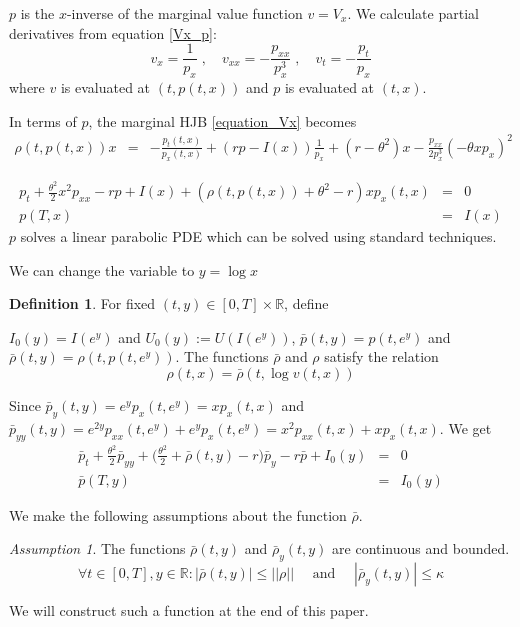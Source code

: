 \documentclass[11pt, psfig]{article}
\theoremstyle{definition}
\newtheorem{definition}[theorem]{Definition}
\theoremstyle{remark}
\newtheorem{assumption}[theorem]{Assumption}
\numberwithin{equation}{section}
\def\sR{\mathbb{R}}
\def\sR{\mathbb{R}}
\newcommand{\be}{\begin{equation}}
\newcommand{\ee}{\end{equation}}
\begin{document}
$p$ is the $x$-inverse of the marginal value function $v=V_x$.
We calculate partial derivatives from equation \eqref{Vx_p}: 
 \begin{equation}\label{relations_vp}
v_{x}=\frac{1}{p_x} \; , \quad v_{xx}=-\frac{p_{xx}}{p_x^3} \; , \quad v_{t}=-\frac{p_t}{p_x}
\end{equation}
where $v$ is evaluated at $(t, p(t,x))$ and $p$ is evaluated at $(t, x)$.

In terms of $p$, the marginal HJB \eqref{equation_Vx} becomes
\begin{eqnarray*}
\rho(t,p(t,x)) x&=&-\frac{p_t(t,x)}{p_x(t,x)}+(rp-I(x))\frac{1}{p_x}+(r-\theta^2)x-\frac{p_{xx}}{2p_x^3}(-\theta xp_x)^2
\end{eqnarray*}

\begin{eqnarray}\label{PDE_p}
p_t+\frac{\theta^2}{2}x^2p_{xx}
-rp+I(x)+(\rho(t,p(t,x))+\theta^2-r)xp_x (t,x)&=&0 \\
p(T,x) &=& I(x)
\end{eqnarray}
$p$ solves a linear parabolic PDE which can be solved using standard techniques.

We can change the variable to $ y=\log x$  
\begin{definition}
For fixed $(t,y)\in [0,T]\times \sR$, define

 $I_0(y)=I(e^y)$ and $U_0(y):=U(I(e^y))$,  
  $\bar{p}(t,y)=p(t,e^y)$ and $\bar{\rho}(t, y)=\rho(t,p(t,e^y))$.
  The functions 
$\bar{\rho}$ and $\rho$ satisfy the relation
\be
\rho(t,x) = \bar{\rho}(t, \log v(t,x)) 
\ee
 \end{definition}
 Since $\bar{p}_{y}(t,y)=e^y p_x(t,e^y) =xp_x(t,x)$ and $\bar{p}_{yy}(t,y)=e^{2y} p_{xx}(t,e^y)+e^yp_x(t,e^y) =x^2p_{xx}(t,x)+xp_x(t,x)$. 
  We get
\begin{eqnarray}
\bar{p}_{t}+\frac{\theta^2}{2}\bar{p}_{yy}+\big(\frac{\theta^2}{2}+\bar{\rho}(t,y)-r\big)\bar{p}_y -r\bar{p} +I_0(y)&=&0 \label{PDE_barp}\\
\bar{p}(T,y)&=&I_0(y)
\end{eqnarray}

We make the following assumptions about the function $\bar{\rho}$.

\begin{assumption}
The functions $\bar{\rho}(t,y)$ and $\bar{\rho}_y(t,y)$ are continuous and bounded.
\be
\forall t\in[0,T], y\in \sR: |\bar{\rho}(t,y)|\leq ||\rho|| \quad \textrm{ and } \quad |\bar{\rho}_{y}(t,y)| \leq  \kappa
\ee
\end{assumption}
We will construct such a function at the end of this paper.
\end{document}
